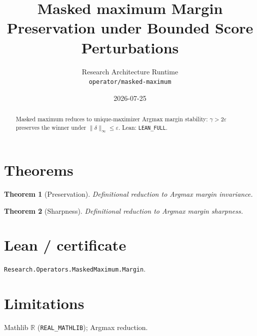 \documentclass[11pt]{article}
\title{Masked maximum Margin Preservation under Bounded Score Perturbations}
\author{Research Architecture Runtime \\ \texttt{operator/masked-maximum}}
\date{2026-07-25}
\newtheorem{theorem}{Theorem}
\begin{document}
\maketitle
\begin{abstract}
Masked maximum reduces to unique-maximizer Argmax margin stability: $\gamma>2\varepsilon$
preserves the winner under $\|\delta\|_\infty\le\varepsilon$. Lean: \texttt{LEAN\_FULL}.
\end{abstract}
\section{Theorems}
\begin{theorem}[Preservation]
Definitional reduction to Argmax margin invariance.
\end{theorem}
\begin{theorem}[Sharpness]
Definitional reduction to Argmax margin sharpness.
\end{theorem}
\section{Lean / certificate}
\texttt{Research.Operators.MaskedMaximum.Margin}.
\section{Limitations}
Mathlib $\mathbb{R}$ (\texttt{REAL\_MATHLIB}); Argmax reduction.
\end{document}
